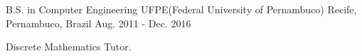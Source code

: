 


\begin{cventries}


\cventry
{B.S. in Computer Engineering} %
{UFPE(Federal University of Pernambuco)} %
{Recife, Pernambuco, Brazil} %
{Aug. 2011 - Dec. 2016} %
{ %
\begin{cvitems}
\item {Discrete Mathematics Tutor.}
\end{cvitems}
}


\end{cventries}